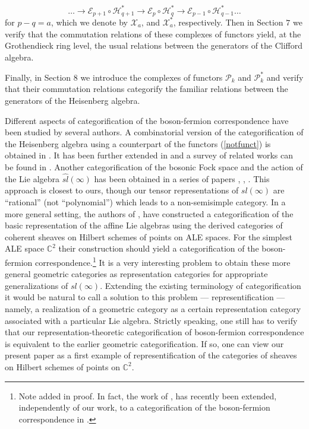 \documentclass[11pt]{amsart}
\newcommand {\Eps} {\mathcal {E}}
\begin{document}
\begin{equation}\label{note2}
 \dots\rightarrow \Eps_{p+1} \circ \mathcal{H}_{q+1}^* \rightarrow \Eps_{p} \circ \mathcal{H}_{q}^*  \rightarrow \Eps_{p-1} \circ \mathcal{H}_{q-1}^* \dots \nonumber 
\end{equation}
for  $p-q=a$, which we denote by  $\mathcal{X}_a$, and $\mathcal{X}_a^*$, respectively.
Then in Section $7$ we verify that the commutation relations of these complexes of functors yield, at the Grothendieck ring level,
the usual relations between the generators of the Clifford algebra.

Finally, in Section $8$ we introduce the complexes of functors $\mathcal{P}_k$ and $\mathcal{P}_k^*$ and verify that their commutation
relations categorify the familiar relations between the generators of the Heisenberg algebra.

Different aspects of categorification of the boson-fermion correspondence have been studied by several authors. A combinatorial 
version of the categorification of the Heisenberg algebra using a counterpart of the functors (\ref{notfunct}) is obtained
in \cite{K2}. It has been further extended in \cite{LS1} and a survey of related works can be found in \cite{LS2}. Another 
categorification of the bosonic Fock space and the action of the Lie algebra $\widehat{sl}(\infty)$ 
has been obtained in a series of papers \cite{HY1}, \cite{HTY}, \cite{HY2}. This approach is 
closest to ours, though our tensor representations of $sl(\infty)$ are ``rational'' (not ``polynomial'') which leads to a non-semisimple 
category. In a more general setting, the authors of \cite{CL1}, \cite{CL2} have constructed
a categorification of the basic representation of the affine Lie algebras using the derived categories of coherent
sheaves on Hilbert schemes of points on ALE spaces. For the simplest ALE space $\mathbb{C}^2$ their construction should yield
a categorification of the boson-fermion correspondence.\footnote{Note added in proof. In fact, the work of \cite{CL1}, \cite{CL2} has recently been extended, independently of our work, to a categorification of the boson-fermion correspondence in \cite{CS}.} It is a very interesting problem to obtain these more general 
geometric categories as representation categories for appropriate generalizations of $sl(\infty)$. Extending the 
existing terminology of categorification it would be natural to call a solution to this problem --- representification ---
namely, a realization of a geometric category as a certain representation category associated with a particular Lie algebra. 
Strictly speaking, one still has to verify that our representation-theoretic categorification of boson-fermion correspondence is equivalent to the earlier
geometric categorification. If so, one can view  our present paper as a first example of representification of the categories of sheaves on Hilbert
schemes of points on $\mathbb{C}^2$.  
\end{document}
